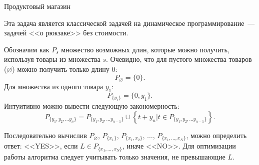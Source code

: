 \begin{tutorial}{Продуктовый магазин}

Эта задача является классической задачей на динамическое программирование~--- задачей <<о рюкзаке>> без стоимости.

Обозначим как $P_s$ множество возможных длин, которые можно получить, используя товары из множества $s$. Очевидно, что для пустого множества товаров ($\varnothing$) можно получить только длину 0: $$P_\varnothing = \{0\}.$$
Для множества из одного товара ${y_1}$: $$P_{\{y_1\}} = \{0, y_1\}.$$
Интуитивно можно вывести следующую закономерность: $$P_{\{y_1, y_2, \ldots y_n\}} = P_{\{y_1, y_2, \ldots y_{n-1}\}} \cup \left\{  t + y_n \Big| t \in P_{\{y_1, y_2, \ldots y_{n-1}\}} \right\}.$$

Последовательно вычислив $P_{\varnothing}$, $P_{\{x_1\}}$, $P_{\{x_1, x_2\}}$, $\ldots$, $P_{\{x_1, \ldots, x_N\}}$, можно определить ответ: <<YES>>, если $L \in P_{\{x_1, \ldots, x_N\}}$, иначе <<NO>>. Для оптимизации работы алгоритма следует учитывать только значения, не превышающие $L$.

\end{tutorial}
